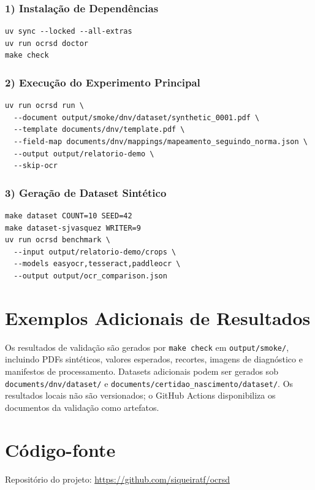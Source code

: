 \documentclass[12pt,a4paper]{article}
\begin{document}
\subsubsection*{1) Instalação de Dependências}
\begin{verbatim}
uv sync --locked --all-extras
uv run ocrsd doctor
make check
\end{verbatim}

\subsubsection*{2) Execução do Experimento Principal}
\begin{verbatim}
uv run ocrsd run \
  --document output/smoke/dnv/dataset/synthetic_0001.pdf \
  --template documents/dnv/template.pdf \
  --field-map documents/dnv/mappings/mapeamento_seguindo_norma.json \
  --output output/relatorio-demo \
  --skip-ocr
\end{verbatim}

\subsubsection*{3) Geração de Dataset Sintético}
\begin{verbatim}
make dataset COUNT=10 SEED=42
make dataset-sjvasquez WRITER=9
uv run ocrsd benchmark \
  --input output/relatorio-demo/crops \
  --models easyocr,tesseract,paddleocr \
  --output output/ocr_comparison.json
\end{verbatim}

\section{Exemplos Adicionais de Resultados}
\label{app:exemplos}

Os resultados de validação são gerados por \texttt{make check} em \texttt{output/smoke/}, incluindo PDFs sintéticos, valores esperados, recortes, imagens de diagnóstico e manifestos de processamento. Datasets adicionais podem ser gerados sob \texttt{documents/dnv/dataset/} e \texttt{documents/certidao\_nascimento/dataset/}. Os resultados locais não são versionados; o GitHub Actions disponibiliza os documentos da validação como artefatos.

\section{Código-fonte}
\label{app:codigo}

Repositório do projeto: \url{https://github.com/siqueiratf/ocrsd}
\end{document}
